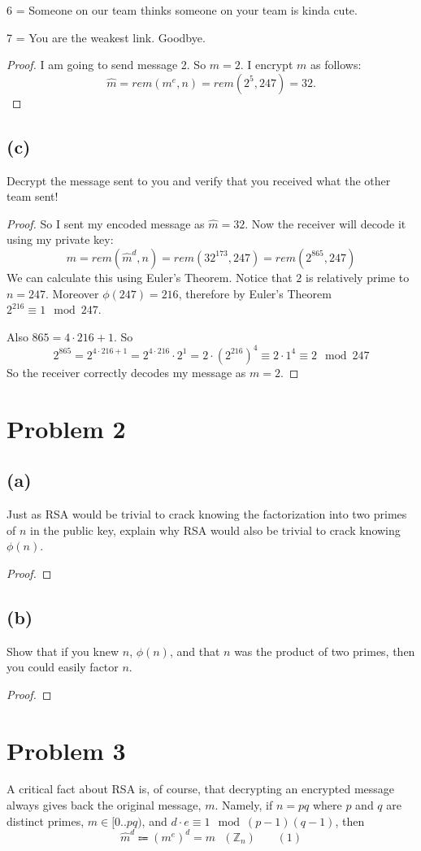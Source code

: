 \documentclass[14pt]{extarticle}
\begin{document}
6 = Someone on our team thinks someone on your team is kinda cute.

7 = You are the weakest link. Goodbye.
\begin{proof}
I am going to send message 2. So $m = 2$. I encrypt $m$ as follows:
$$
\hat{m} = rem(m^e, n) = rem(2^5, 247) = 32.
$$
\end{proof}

\subsection{(c)}
Decrypt the message sent to you and verify that you received what the other team sent!
\begin{proof}
So I sent my encoded message as $\hat{m} = 32$. Now the receiver will decode it using my private key:
$$
m = rem(\hat{m}^d, n) = rem(32^{173}, 247) = rem(2^{865}, 247)
$$
We can calculate this using Euler's Theorem. Notice that $2$ is relatively prime to $n = 247$. Moreover $\phi(247) = 216$, therefore by Euler's Theorem $2^{216} \equiv 1 \mod 247$.

Also $865 = 4 \cdot 216 + 1$. So
$$
2^{865} = 2^{4 \cdot 216 + 1} = 2^{4 \cdot 216}\cdot 2^1 = 2 \cdot (2^{216})^4 \equiv 2 \cdot 1^4 \equiv 2 \mod 247
$$
So the receiver correctly decodes my message as $m = 2$.
\end{proof}

\section{Problem 2}
\subsection{(a)}
Just as RSA would be trivial to crack knowing the factorization into two primes of $n$ in the public key, explain why RSA would also be trivial to crack knowing $\phi(n)$.
\begin{proof}
\end{proof}

\subsection{(b)}
Show that if you knew $n$, $\phi(n)$, and that $n$ was the product of two primes, then you could easily factor $n$.
\begin{proof}
\end{proof}

\section{Problem 3}
A critical fact about RSA is, of course, that decrypting an encrypted message always gives back the original message, $m$. Namely, if $n = pq$ where $p$ and $q$ are distinct primes, $m \in [0..pq)$, and $d \cdot e \equiv 1 \mod (p - 1)(q - 1)$, then 
$$
\hat{m}^d \Coloneqq (m^e)^d = m \,\,\,\,(\mathbb{Z}_n)\,\,\,\,\,\,\,\,\,\,\, (1)
$$
\end{document}
